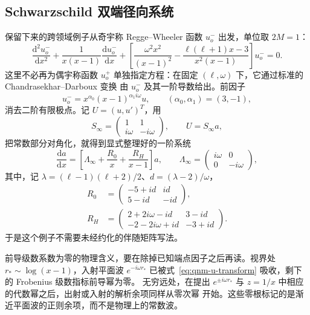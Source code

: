 \documentclass[11pt,a4paper]{ctexart}
\newcommand{\dd}{\mathrm d}
\renewcommand{\_}{\origunderscore\allowbreak}
\begin{document}
\subsection{Schwarzschild 双端径向系统}
\label{subsec:qnm-example}

保留下来的跨领域例子从奇宇称 Regge--Wheeler 函数 $u^-_o$ 出发，单位取 $2M=1$：
\begin{equation}
 \frac{\dd^2u^-_o}{\dd x^2}
 +\frac{1}{x(x-1)}\frac{\dd u^-_o}{\dd x}
 +\left[\frac{\omega^2x^2}{(x-1)^2}
 -\frac{\ell(\ell+1)x-3}{x^2(x-1)}\right]u^-_o=0.
 \label{eq:qnm-original-rw}
\end{equation}
这里不必再为偶宇称函数 $u^+_o$ 单独指定方程：在固定 $(\ell,\omega)$ 下，它通过标准的
Chandrasekhar--Darboux 变换 \cite{Glampedakis:2017rar} 由 $u^-_o$ 及其一阶导数给出。前因子
\begin{equation}
 u^-_o=x^{\alpha_0}(x-1)^{\alpha_1 i\omega}u,
 \qquad (\alpha_0,\alpha_1)=(3,-1),
 \label{eq:qnm-u-transform}
\end{equation}
消去二阶有限极点。记 $U=(u,u')^T$，用
\begin{equation}
 S_\infty=\begin{pmatrix}1&1\\ i\omega&-i\omega\end{pmatrix},
 \qquad U=S_\infty a,
\end{equation}
把常数部分对角化，就得到显式整理好的一阶系统
\begin{equation}
 \frac{\dd a}{\dd x}=\left[\Lambda_\infty+
 \frac{R_0}{x}+\frac{R_H}{x-1}\right]a,
 \qquad \Lambda_\infty=\begin{pmatrix}i\omega&0\\0&-i\omega\end{pmatrix},
 \label{eq:qnm-diagonal-system}
\end{equation}
其中，记 $\lambda=(\ell-1)(\ell+2)/2$、$d=(\lambda-2)/\omega$，
\begin{align}
 R_0&=\begin{pmatrix}-5+id&id\\5-id&-id\end{pmatrix},\\
 R_H&=\begin{pmatrix}2+2i\omega-id&3-id\\-2-2i\omega+id&-3+id\end{pmatrix}.
 \label{eq:qnm-residue-matrices}
\end{align}
于是这个例子不需要未经约化的伴随矩阵写法。

前导级数系数为零的物理含义，要在除掉已知端点因子之后再读。视界处 $r_*\sim\log(x-1)$，入射平面波
$e^{-i\omega r_*}$ 已被式~\eqref{eq:qnm-u-transform} 吸收，剩下的 Frobenius 级数指标前导幂为零。
无穷远处，在提出 $e^{\pm i\omega r_*}$ 与 $z=1/x$ 中相应的代数幂之后，出射或入射的解析余项同样从零次幂
开始。这些零根标记的是渐近平面波的正则余项，而不是物理上的常数波。
\end{document}
